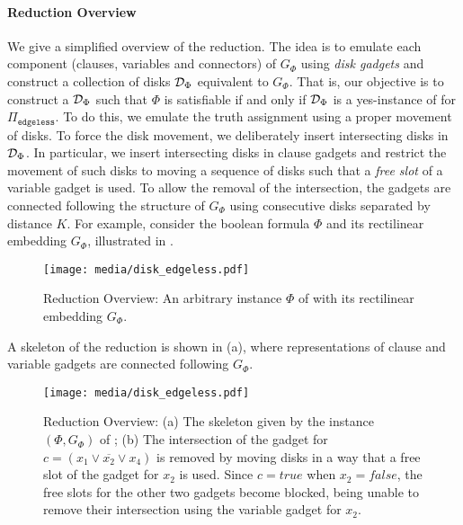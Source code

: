 \paragraph*{Reduction Overview} 
\fi
We give a simplified overview of the reduction. The idea is to emulate each component (clauses, variables and connectors) of $G_{\Phi}$ using \emph{disk gadgets} and construct a collection of disks $\mathcal{D}_\Phi$ equivalent to $G_{\Phi}$. 
That is, our objective is to construct a $\mathcal{D}_\Phi$ such that $\Phi$ is satisfiable if and only if $\mathcal{D}_\Phi$ is a yes-instance of {\ggedmm} for $\Pi_{\texttt{edgeless}}$.
%
To do this, we emulate the truth assignment using a proper movement of disks. 
To force the disk movement, we deliberately insert intersecting disks in $\mathcal{D}_\Phi$. 
In particular, we insert intersecting disks in clause gadgets and restrict the movement of such disks to moving a sequence of disks such that a \emph{free slot} of a variable gadget is used.
To allow the removal of the intersection, the gadgets are connected following the structure of $G_\Phi$ using consecutive disks separated by distance $K$.
%
%
For example, consider the boolean formula $\Phi$ 
and its rectilinear embedding $G_\Phi$, illustrated in . 
\begin{figure}[!bt]
    \centering
    \texttt{[image: media/disk\_edgeless.pdf]}
    \caption{Reduction Overview: An arbitrary instance $\Phi$ of {\pthreesat} with its rectilinear embedding $G_\Phi$.}
    \label{fig:reduction_overview_a}
\end{figure}
A skeleton of the reduction is shown in (a), where representations of clause and variable gadgets are connected following $G_\Phi$. 
\begin{figure}[!tb]
    \centering
    \texttt{[image: media/disk\_edgeless.pdf]}
    \caption{Reduction Overview: (a) The skeleton given by the instance $(\Phi, G_\Phi)$ of ; (b) The intersection of the gadget for $c = (x_1 \lor \overline{x_2} \lor x_4)$ is removed by moving disks in a way that a free slot of the gadget for $x_2$ is used. Since $c = \mathit{true}$ when $x_2 = \mathit{false}$, the free slots for the other two gadgets become blocked, being unable to remove their intersection using the variable gadget for $x_2$.}
    \label{fig:reduction_overview_bc}
\end{figure}
